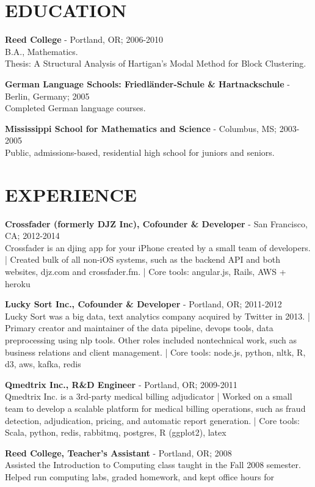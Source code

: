 \documentclass[11pt, line, margin]{res}
\newcommand{\prettysection}[1]{\setromanfont{TitilliumTitle20}\section{#1}\setromanfont{TitilliumText22L}}
\begin{document}

\begin{resume}
\prettysection{EDUCATION}
{\bf Reed College} -  Portland, OR; 2006-2010 \\ 
B.A., Mathematics. \\
Thesis: A Structural Analysis of Hartigan's Modal Method for Block
Clustering.

{\bf German Language Schools: Friedl\"{a}nder-Schule \& Hartnackschule} - Berlin, Germany; 2005 \\
Completed German language courses.

{\bf Mississippi School for Mathematics and Science} - Columbus, MS; 2003-2005 \\ 
Public, admissions-based, residential high school for juniors and seniors. 

\prettysection{EXPERIENCE}

{\bf Crossfader (formerly DJZ Inc), Cofounder \& Developer} - San Francisco, CA; 2012-2014 \\
Crossfader is an djing app for your iPhone created by a small team of
developers. | Created bulk of all non-iOS systems, such as the backend
API and both websites, djz.com and crossfader.fm. | Core tools:
angular.js, Rails, AWS + heroku

{\bf Lucky Sort Inc., Cofounder \& Developer} - Portland, OR; 2011-2012 \\
Lucky Sort was a big data, text analytics company acquired by
Twitter in 2013. | Primary creator and maintainer of the data pipeline,
devops tools, data preprocessing using nlp tools.  Other roles
included nontechnical work, such as business relations and client
management. | Core tools: node.js, python, nltk, R, d3, aws, kafka, redis

{\bf Qmedtrix Inc., R\&D Engineer} - Portland, OR; 2009-2011 \\
Qmedtrix Inc. is a 3rd-party medical billing adjudicator | Worked on a small team to develop a scalable platform for medical billing operations, such as fraud detection, adjudication,
pricing, and automatic report generation.  | Core tools: Scala,
python, redis, rabbitmq, postgres, R (ggplot2), latex

{\bf Reed College, Teacher's Assistant} - Portland, OR;
2008 \\
Assisted the Introduction to Computing class taught in the Fall 2008
semester. Helped run computing labs, graded homework, and kept office hours for



\end{resume}
\end{document}
